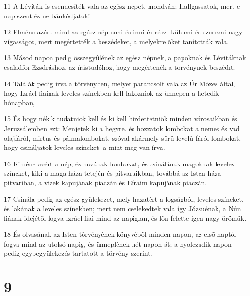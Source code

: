 \par 11 A Léviták is csendesíték vala az egész népet, mondván: Hallgassatok, mert e nap szent és ne bánkódjatok!
\par 12 Elméne azért mind az egész nép enni és inni és részt küldeni és szerezni nagy vígasságot, mert megértették a beszédeket, a melyekre õket tanították vala.
\par 13 Másod napon pedig összegyûlének az egész népnek, a papoknak és Lévitáknak családfõi Ezsdráshoz, az írástudóhoz, hogy megértenék a törvénynek beszédit.
\par 14 Találák pedig írva a törvényben, melyet parancsolt vala az Úr Mózes által, hogy Izráel fiainak leveles színekben kell lakozniok az ünnepen a hetedik hónapban,
\par 15 És hogy nékik tudatniok kell és ki kell hirdettetniök minden városaikban és Jeruzsálemben ezt: Menjetek ki a hegyre, és hozzatok lombokat a nemes és vad olajfáról, mirtus és pálmalombokat, szóval akármely sûrû levelû fáról lombokat, hogy csináljatok leveles színeket, a mint meg van írva.
\par 16 Kiméne azért a nép, és hozának lombokat, és csinálának magoknak leveles színeket, kiki a maga háza tetején és pitvaraikban, továbbá az Isten háza pitvariban, a vizek kapujának piaczán és Efraim kapujának piaczán.
\par 17 Csinála pedig az egész gyülekezet, mely hazatért a fogságból, leveles színeket, és lakának a leveles színekben; mert nem cselekedtek vala így Józsuénak, a Nún fiának idejétõl fogva Izráel fiai mind az napiglan, és lõn felette igen nagy örömük.
\par 18 És olvasának az Isten törvényének könyvébõl minden napon, az elsõ naptól fogva mind az utolsó napig, és ünneplének hét napon át; a nyolczadik napon pedig egybegyülekezés tartatott a törvény szerint.

\chapter{9}

